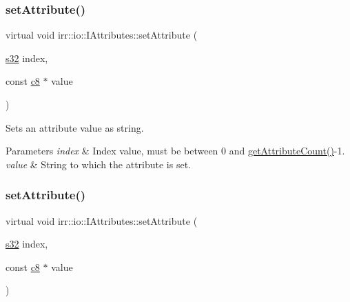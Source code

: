 \subsubsection{\texorpdfstring{set\+Attribute()}{setAttribute()}\hspace{0.1cm}{\footnotesize\ttfamily [3/10]}}
{\footnotesize\ttfamily virtual void irr\+::io\+::\+I\+Attributes\+::set\+Attribute (\begin{DoxyParamCaption}\item[{\hyperlink{namespaceirr_ac66849b7a6ed16e30ebede579f9b47c6}{s32}}]{index,  }\item[{const \hyperlink{namespaceirr_a9395eaea339bcb546b319e9c96bf7410}{c8} $\ast$}]{value }\end{DoxyParamCaption})\hspace{0.3cm}{\ttfamily [pure virtual]}}



Sets an attribute value as string. 


\begin{DoxyParams}{Parameters}
{\em index} & Index value, must be between 0 and \hyperlink{classirr_1_1io_1_1IAttributes_a796bdd9440ee7ba0b6742a90a82870b6}{get\+Attribute\+Count()}-\/1. \\
\hline
{\em value} & String to which the attribute is set. \\
\hline
\end{DoxyParams}
\mbox{\label{classirr_1_1io_1_1IAttributes_a0d270e61c06e6553857f90946fe177f7}} 
\subsubsection{\texorpdfstring{set\+Attribute()}{setAttribute()}\hspace{0.1cm}{\footnotesize\ttfamily [4/10]}}
{\footnotesize\ttfamily virtual void irr\+::io\+::\+I\+Attributes\+::set\+Attribute (\begin{DoxyParamCaption}\item[{\hyperlink{namespaceirr_ac66849b7a6ed16e30ebede579f9b47c6}{s32}}]{index,  }\item[{const \hyperlink{namespaceirr_a9395eaea339bcb546b319e9c96bf7410}{c8} $\ast$}]{value }\end{DoxyParamCaption})\hspace{0.3cm}{\ttfamily [pure virtual]}}



